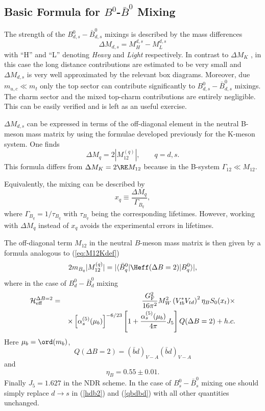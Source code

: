 \subsection{Basic Formula for $B^0$-$\bar B^0$ Mixing}
            \label{subsec:BBformula}
The strength of the $B^0_{d,s}-\bar B^0_{d,s}$ mixings
is described by the mass differences
\begin{equation}
\Delta M_{d,s}= M_H^{d,s}-M_L^{d,s}
\end{equation}
with ``H'' and ``L'' denoting {\it Heavy} and {\it Light} respectively. 
In contrast to $\Delta M_K$ , in this case the long distance contributions
are estimated to be very small and $\Delta M_{d,s}$ is very well
approximated by the relevant box diagrams. 
Moreover, due $m_{u,c}\ll m_t$ 
only the top sector can contribute significantly to 
$B_{d,s}^0-\bar B_{d,s}^0$ mixings.
The charm sector and the mixed top-charm contributions are
entirely negligible. This can be easily verified and is left as an useful
exercise.

 $\Delta M_{d,s}$ can be expressed
in terms of the off-diagonal element in the neutral B-meson mass matrix
by using the formulae developed previously for the K-meson system.
One finds
\begin{equation}
\Delta M_q= 2 |M_{12}^{(q)}|, \qquad q=d,s.
\label{eq:xdsdef}
\end{equation}
This formula differs from $\Delta M_K=2 \RE M_{12}$ because in the
B-system $\Gamma_{12}\ll M_{12}$.

Equivalently, the mixing can be described by
\begin{equation}
x_q \equiv \frac{\Delta M_q}{\Gamma_{B_q}},
\end{equation}
where  $\Gamma_{B_q} = 1/\tau_{B_q}$ with
$\tau_{B_q}$ being the corresponding lifetimes.
However, working with $\Delta M_q$ instead of $x_q$
avoids the experimental errors in lifetimes. 

The off-diagonal
term $M_{12}$ in the neutral $B$-meson mass matrix is then given by
a formula analogous to (\ref{eq:M12Kdef})
\begin{equation}
2 m_{B_q} |M_{12}^{(q)}| = 
|\langle \bar B^0_q| \Heff(\Delta B=2) |B^0_q\rangle|,
\label{eq:M12Bdef}
\end{equation}
where 
in the case of $B_d^0-\bar B_d^0$
mixing 
\begin{eqnarray}\label{hdb2}
{\cal H}^{\Delta B=2}_{\rm eff}&=&\frac{G^2_{\rm F}}{16\pi^2}M^2_W
 \left(V^\ast_{tb}V_{td}\right)^2 \eta_{B}
 S_0(x_t)\times
\nonumber\\
& &\times \left[\alpha^{(5)}_s(\mu_b)\right]^{-6/23}\left[
  1 + \frac{\alpha^{(5)}_s(\mu_b)}{4\pi} J_5\right]  Q(\Delta B=2) + h. c.
\end{eqnarray}
Here $\mu_b=\ord(m_b)$,
\begin{equation}\label{qbdbd}
Q(\Delta B=2)=(\bar bd)_{V-A}(\bar bd)_{V-A}
\end{equation}
and \cite{BJW90}
\begin{equation}
\eta_B=0.55\pm0.01.
\end{equation}
Finally $J_5=1.627$ in the NDR scheme. 
In the case of  $B_s^0-\bar B_s^0$ mixing one should simply replace
$d\to s$ in (\ref{hdb2}) and (\ref{qbdbd}) with all other quantities
unchanged.

